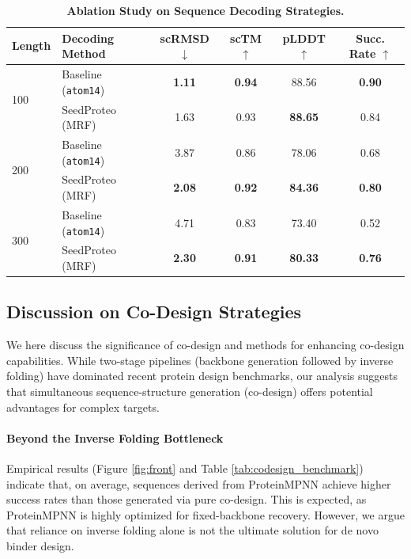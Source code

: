\documentclass[]{bytedance_seed}
\begin{document}


\begin{table}[t]
\centering
\caption{\textbf{Ablation Study on Sequence Decoding Strategies.}}
\label{tab:ablation_mrf}
\begin{tabular}{l l cccc}
\toprule
\textbf{Length} & \textbf{Decoding Method} & \textbf{scRMSD} $\downarrow$ & \textbf{scTM} $\uparrow$ & \textbf{pLDDT} $\uparrow$ & \textbf{Succ. Rate} $\uparrow$  \\
\midrule
\multirow{2}{*}{100} 
& Baseline (\texttt{atom14}) & \textbf{1.11} & \textbf{0.94} & 88.56 & \textbf{0.90} \\
& SeedProteo (MRF)  & 1.63 & 0.93 & \textbf{88.65} & 0.84 \\
\midrule
\multirow{2}{*}{200} 
& Baseline (\texttt{atom14}) & 3.87 & 0.86 & 78.06 & 0.68 \\
& SeedProteo (MRF)  & \textbf{2.08} & \textbf{0.92} & \textbf{84.36} & \textbf{0.80} \\
\midrule
\multirow{2}{*}{300} 
& Baseline (\texttt{atom14}) & 4.71 & 0.83 & 73.40 & 0.52 \\
& SeedProteo (MRF)  & \textbf{2.30} & \textbf{0.91} & \textbf{80.33} & \textbf{0.76} \\
\bottomrule
\end{tabular}%
\end{table}



\subsection{Discussion on Co-Design Strategies}
We here discuss the significance of co-design and methods for enhancing co-design capabilities. While two-stage pipelines (backbone generation followed by inverse folding) have dominated recent protein design benchmarks, our analysis suggests that simultaneous sequence-structure generation (co-design) offers potential advantages for complex targets.

\paragraph{Beyond the Inverse Folding Bottleneck}
Empirical results (Figure \ref{fig:front} and Table \ref{tab:codesign_benchmark}) indicate that, on average, sequences derived from ProteinMPNN achieve higher success rates than those generated via pure co-design. This is expected, as ProteinMPNN is highly optimized for fixed-backbone recovery. However, we argue that reliance on inverse folding alone is not the ultimate solution for de novo binder design.
\end{document}
